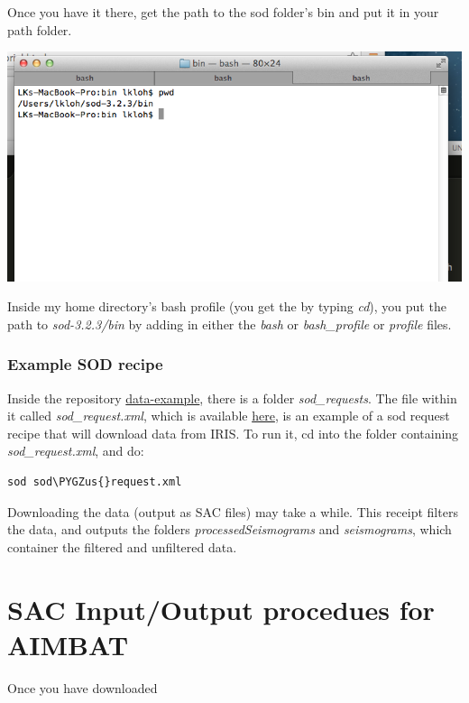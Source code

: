 \documentclass[letterpaper,10pt,english]{sphinxmanual}
\def\PYGZus{\char`\_}
\begin{document}
Once you have it there, get the path to the sod folder's bin and put it in your path folder.

\includegraphics{path_to_sod_bin.png}

Inside my home directory's bash profile (you get the by typing \emph{cd}), you put the path to \emph{sod-3.2.3/bin} by adding in either the \emph{bash} or \emph{bash\_profile} or \emph{profile} files.


\subsection{Example SOD recipe}
\label{docfiles/gettingData:example-sod-recipe}
Inside the repository \href{https://github.com/pysmo/data-example}{data-example}, there is a folder \emph{sod\_requests}. The file within it called \emph{sod\_request.xml}, which is available \href{https://github.com/pysmo/data-example/blob/master/sod\_requests/sod\_request.xml}{here}, is an example of a sod request recipe that will download data from IRIS. To run it, cd into the folder containing \emph{sod\_request.xml}, and do:

\begin{Verbatim}[commandchars=\\\{\}]
sod sod\PYGZus{}request.xml
\end{Verbatim}

Downloading the data (output as SAC files) may take a while. This receipt filters the data, and outputs the folders \emph{processedSeismograms} and \emph{seismograms}, which container the filtered and unfiltered data.


\chapter{SAC Input/Output procedues for AIMBAT}
\label{docfiles/sacioAIMBAT:sac-input-output-procedues-for-aimbat}\label{docfiles/sacioAIMBAT::doc}
Once you have downloaded
\end{document}
